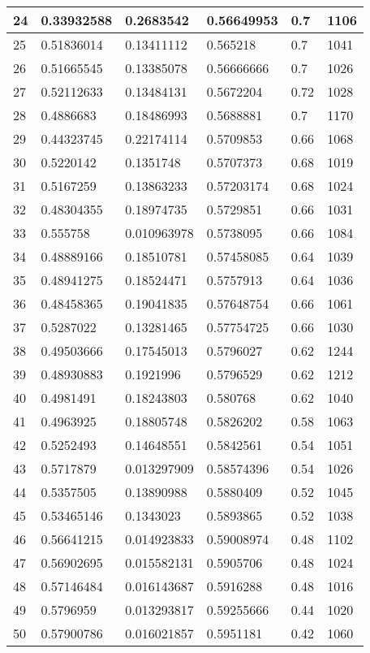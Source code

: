 \begin{longtable}{|l|l|l|l|l|l|}
24 & 0.33932588 & 0.2683542 & 0.56649953 & 0.7 & 1106 \\ \hline 
25 & 0.51836014 & 0.13411112 & 0.565218 & 0.7 & 1041 \\ \hline 
26 & 0.51665545 & 0.13385078 & 0.56666666 & 0.7 & 1026 \\ \hline 
27 & 0.52112633 & 0.13484131 & 0.5672204 & 0.72 & 1028 \\ \hline 
28 & 0.4886683 & 0.18486993 & 0.5688881 & 0.7 & 1170 \\ \hline 
29 & 0.44323745 & 0.22174114 & 0.5709853 & 0.66 & 1068 \\ \hline 
30 & 0.5220142 & 0.1351748 & 0.5707373 & 0.68 & 1019 \\ \hline 
31 & 0.5167259 & 0.13863233 & 0.57203174 & 0.68 & 1024 \\ \hline 
32 & 0.48304355 & 0.18974735 & 0.5729851 & 0.66 & 1031 \\ \hline 
33 & 0.555758 & 0.010963978 & 0.5738095 & 0.66 & 1084 \\ \hline 
34 & 0.48889166 & 0.18510781 & 0.57458085 & 0.64 & 1039 \\ \hline 
35 & 0.48941275 & 0.18524471 & 0.5757913 & 0.64 & 1036 \\ \hline 
36 & 0.48458365 & 0.19041835 & 0.57648754 & 0.66 & 1061 \\ \hline 
37 & 0.5287022 & 0.13281465 & 0.57754725 & 0.66 & 1030 \\ \hline 
38 & 0.49503666 & 0.17545013 & 0.5796027 & 0.62 & 1244 \\ \hline 
39 & 0.48930883 & 0.1921996 & 0.5796529 & 0.62 & 1212 \\ \hline 
40 & 0.4981491 & 0.18243803 & 0.580768 & 0.62 & 1040 \\ \hline 
41 & 0.4963925 & 0.18805748 & 0.5826202 & 0.58 & 1063 \\ \hline 
42 & 0.5252493 & 0.14648551 & 0.5842561 & 0.54 & 1051 \\ \hline 
43 & 0.5717879 & 0.013297909 & 0.58574396 & 0.54 & 1026 \\ \hline 
44 & 0.5357505 & 0.13890988 & 0.5880409 & 0.52 & 1045 \\ \hline 
45 & 0.53465146 & 0.1343023 & 0.5893865 & 0.52 & 1038 \\ \hline 
46 & 0.56641215 & 0.014923833 & 0.59008974 & 0.48 & 1102 \\ \hline 
47 & 0.56902695 & 0.015582131 & 0.5905706 & 0.48 & 1024 \\ \hline 
48 & 0.57146484 & 0.016143687 & 0.5916288 & 0.48 & 1016 \\ \hline 
49 & 0.5796959 & 0.013293817 & 0.59255666 & 0.44 & 1020 \\ \hline 
50 & 0.57900786 & 0.016021857 & 0.5951181 & 0.42 & 1060 \\ \hline 
\end{longtable}